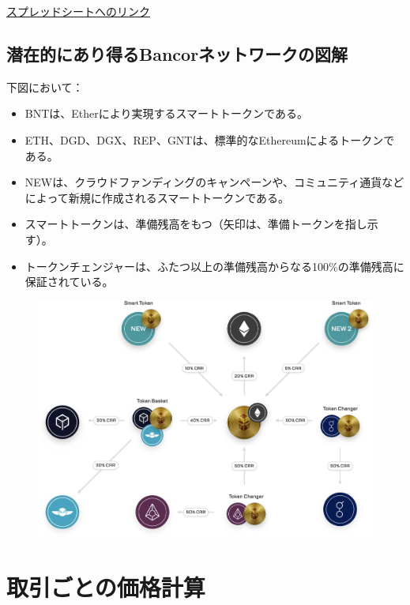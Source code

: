 \documentclass{jsarticle}
\begin{document}
  \href{https://goo.gl/3hR6e8}{スプレッドシートへのリンク}

  \subsection{潜在的にあり得るBancorネットワークの図解}

  下図において：

  \begin{itemize}
    \item BNTは、Etherにより実現するスマートトークンである。
    \item ETH、DGD、DGX、REP、GNTは、標準的なEthereumによるトークンである。
    \item NEWは、クラウドファンディングのキャンペーンや、コミュニティ通貨などによって新規に作成されるスマートトークンである。
    \item スマートトークンは、準備残高をもつ（矢印は、準備トークンを指し示す）。  
    \item トークンチェンジャーは、ふたつ以上の準備残高からなる100\%の準備残高に保証されている。
  \end{itemize}

  \begin{figure}[h]
   \begin{center}
    \includegraphics{fig5.png}
   \end{center}
  \end{figure}

\section{取引ごとの価格計算}
\end{document}
